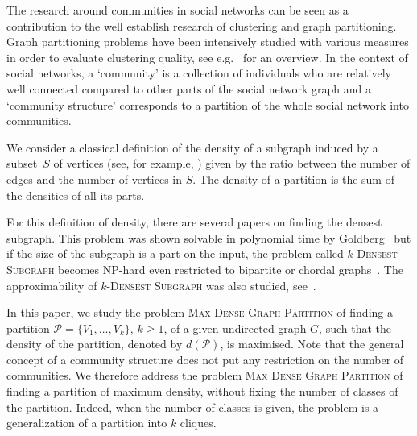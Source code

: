 \documentclass[a4paper,USenglish,cleveref, autoref]{lipics-v2021}
\newcommand\MDGP{\textsc{Max Dense Graph Partition}}
\begin{document}
The research around communities in social networks can be seen as a contribution to the well establish
research of clustering and graph partitioning. Graph partitioning problems have
been intensively studied with various measures in order to evaluate clustering quality, see e.g.~\cite{New2004,Sch2007,For2010,BulucMSS016}  for an overview. In the context of social networks, a ‘community’ is a collection of individuals who are relatively well connected compared to other parts of the social network graph and a ‘community structure’ corresponds to a partition of the whole social network into communities.

We consider a classical definition of the density of a subgraph induced by a subset~$S$ of vertices (see, for example,  \cite{bib:density:darlay2012DENSE,bib:density:goldberg1984finding}) given by the ratio between the number of edges and the number of vertices in $S$.  The density of a partition  is the sum of the densities of all its parts. 

For this definition of density, there are several papers on finding the densest subgraph. This problem was shown solvable in polynomial time by Goldberg~\cite{bib:density:goldberg1984finding} but if the size of the subgraph is a part on the input, the problem called \textsc{$k$-Densest Subgraph} becomes NP-hard even restricted to bipartite or chordal graphs~\cite{bib:density:corneil1984clustering}. The approximability of \textsc{$k$-Densest Subgraph} was also  studied, see~\cite{Khot06,FeigePK01,BhaskaraCCFV10}. 
 
 
 
 
In this paper, we study the problem \MDGP{} of finding a partition $\mathcal{P} = \{ V_1, \dots, V_k\}$, $k \geq 1$, of a given undirected graph $G$, such that the density of the partition, denoted by $d(\mathcal{P})$, is maximised.
Note that the general concept of a community structure does not put any restriction on the
number of communities. We therefore address the problem \MDGP{} of finding a partition of maximum density, without fixing the number of classes of
the partition. 
Indeed, when the number of classes is given, the problem is a generalization of a partition into $k$ cliques.  
\end{document}
